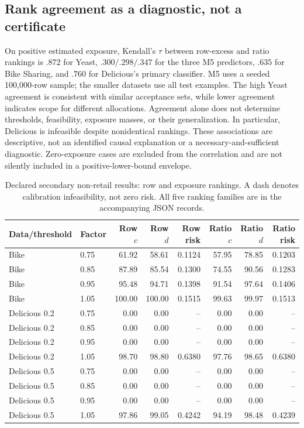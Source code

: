 \subsection{Rank agreement as a diagnostic, not a certificate}
On positive estimated exposure, Kendall's $\tau$ between row-excess and ratio rankings is $.872$ for Yeast, $.300/.298/.347$ for the three M5 predictors, $.635$ for Bike Sharing, and $.760$ for Delicious's primary classifier. M5 uses a seeded 100,000-row sample; the smaller datasets use all test examples. The high Yeast agreement is consistent with similar acceptance sets, while lower agreement indicates scope for different allocations. Agreement alone does not determine thresholds, feasibility, exposure masses, or their generalization. In particular, Delicious is infeasible despite nonidentical rankings. These associations are descriptive, not an identified causal explanation or a necessary-and-sufficient diagnostic. Zero-exposure cases are excluded from the correlation and are not silently included in a positive-lower-bound envelope.
\begin{table}[t]\centering\scriptsize
\caption{Declared secondary non-retail results: row and exposure rankings. A dash denotes calibration infeasibility, not zero risk. All five ranking families are in the accompanying JSON records.}
\begin{tabular}{llrrrrrr}\toprule
Data/threshold & Factor & Row $c$ & Row $d$ & Row risk & Ratio $c$ & Ratio $d$ & Ratio risk\\\midrule
Bike & 0.75 & 61.92 & 58.61 & 0.1124 & 57.95 & 78.85 & 0.1203\\
Bike & 0.85 & 87.89 & 85.54 & 0.1300 & 74.55 & 90.56 & 0.1283\\
Bike & 0.95 & 95.48 & 94.71 & 0.1398 & 91.54 & 97.64 & 0.1406\\
Bike & 1.05 & 100.00 & 100.00 & 0.1515 & 99.63 & 99.97 & 0.1513\\
Delicious 0.2 & 0.75 & 0.00 & 0.00 & -- & 0.00 & 0.00 & --\\
Delicious 0.2 & 0.85 & 0.00 & 0.00 & -- & 0.00 & 0.00 & --\\
Delicious 0.2 & 0.95 & 0.00 & 0.00 & -- & 0.00 & 0.00 & --\\
Delicious 0.2 & 1.05 & 98.70 & 98.80 & 0.6380 & 97.76 & 98.65 & 0.6380\\
Delicious 0.5 & 0.75 & 0.00 & 0.00 & -- & 0.00 & 0.00 & --\\
Delicious 0.5 & 0.85 & 0.00 & 0.00 & -- & 0.00 & 0.00 & --\\
Delicious 0.5 & 0.95 & 0.00 & 0.00 & -- & 0.00 & 0.00 & --\\
Delicious 0.5 & 1.05 & 97.86 & 99.05 & 0.4242 & 94.19 & 98.48 & 0.4239\\
\bottomrule\end{tabular}\end{table}

